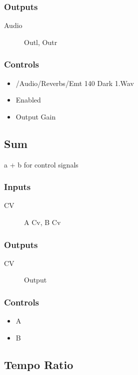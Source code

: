 \subsubsection{Outputs}
\begin{description}
\item [Audio] Outl, Outr
\end{description}

\subsubsection{Controls}
\begin{itemize}
\item /Audio/Reverbs/Emt 140 Dark 1.Wav
\item Enabled
\item Output Gain
\end{itemize}

\subsection{Sum}

a + b for control signals



\subsubsection{Inputs}
\begin{description}
\item [CV] A Cv, B Cv
\end{description}

\subsubsection{Outputs}
\begin{description}
\item [CV] Output
\end{description}

\subsubsection{Controls}
\begin{itemize}
\item A
\item B
\end{itemize}

\subsection{Tempo Ratio}

